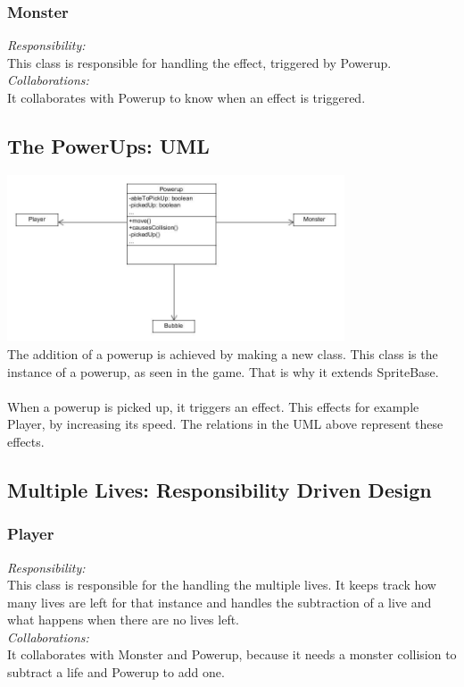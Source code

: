 \subsubsection{Monster}
\textit{Responsibility:} \\
This class is responsible for handling the effect, triggered by Powerup. \\
\textit{Collaborations:} \\
It collaborates with Powerup to know when an effect is triggered. \\

\subsection{The PowerUps: UML}

\includegraphics[width=100mm]{uml_powerups.jpg}\\[1cm]
The addition of a powerup is achieved by making a new class. This class is the instance of a powerup, as seen in the game. That is why it extends SpriteBase. 
\\\\
When a powerup is picked up, it triggers an effect. This effects for example Player, by increasing its speed. The relations in the UML above represent these effects.


\subsection{Multiple Lives: Responsibility Driven Design}

\subsubsection{Player}
\textit{Responsibility:} \\
This class is responsible for the handling the multiple lives. It keeps track how many lives are left for that instance and handles the subtraction of a live and what happens when there are no lives left. \\
\textit{Collaborations:} \\
It collaborates with Monster and Powerup, because it needs a monster collision to subtract a life and Powerup to add one.

